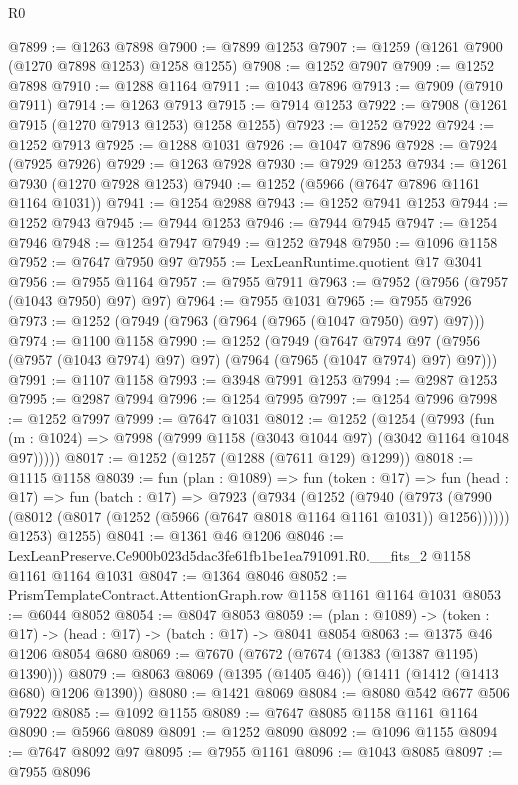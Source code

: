 \begin{lexlean}{R0}
\begin{coremodule}
@7899 := @1263 @7898
@7900 := @7899 @1253
@7907 := @1259 (@1261 @7900 (@1270 @7898 @1253) @1258 @1255)
@7908 := @1252 @7907
@7909 := @1252 @7898
@7910 := @1288 @1164
@7911 := @1043 @7896
@7913 := @7909 (@7910 @7911)
@7914 := @1263 @7913
@7915 := @7914 @1253
@7922 := @7908 (@1261 @7915 (@1270 @7913 @1253) @1258 @1255)
@7923 := @1252 @7922
@7924 := @1252 @7913
@7925 := @1288 @1031
@7926 := @1047 @7896
@7928 := @7924 (@7925 @7926)
@7929 := @1263 @7928
@7930 := @7929 @1253
@7934 := @1261 @7930 (@1270 @7928 @1253)
@7940 := @1252 (@5966 (@7647 @7896 @1161 @1164 @1031))
@7941 := @1254 @2988
@7943 := @1252 @7941 @1253
@7944 := @1252 @7943
@7945 := @7944 @1253
@7946 := @7944 @7945
@7947 := @1254 @7946
@7948 := @1254 @7947
@7949 := @1252 @7948
@7950 := @1096 @1158
@7952 := @7647 @7950 @97
@7955 := LexLeanRuntime.quotient @17 @3041
@7956 := @7955 @1164
@7957 := @7955 @7911
@7963 := @7952 (@7956 (@7957 (@1043 @7950) @97) @97)
@7964 := @7955 @1031
@7965 := @7955 @7926
@7973 := @1252 (@7949 (@7963 (@7964 (@7965 (@1047 @7950) @97) @97)))
@7974 := @1100 @1158
@7990 := @1252
    (@7949
      (@7647 @7974 @97 (@7956 (@7957 (@1043 @7974) @97) @97) (@7964 (@7965 (@1047 @7974) @97) @97)))
@7991 := @1107 @1158
@7993 := @3948 @7991 @1253
@7994 := @2987 @1253
@7995 := @2987 @7994
@7996 := @1254 @7995
@7997 := @1254 @7996
@7998 := @1252 @7997
@7999 := @7647 @1031
@8012 := @1252
    (@1254
      (@7993 (fun (m : @1024) => @7998 (@7999 @1158 (@3043 @1044 @97) (@3042 @1164 @1048 @97)))))
@8017 := @1252 (@1257 (@1288 (@7611 @129) @1299))
@8018 := @1115 @1158
@8039 := fun (plan : @1089) =>
  fun (token : @17) =>
  fun (head : @17) =>
  fun (batch : @17) =>
  @7923
    (@7934
      (@1252
        (@7940
          (@7973 (@7990 (@8012 (@8017 (@1252 (@5966 (@7647 @8018 @1164 @1161 @1031)) @1256))))))
        @1253)
      @1255)
@8041 := @1361 @46 @1206
@8046 := LexLeanPreserve.Ce900b023d5dac3fe61fb1be1ea791091.R0.__fits_2 @1158 @1161 @1164 @1031
@8047 := @1364 @8046
@8052 := PrismTemplateContract.AttentionGraph.row @1158 @1161 @1164 @1031
@8053 := @6044 @8052
@8054 := @8047 @8053
@8059 := (plan : @1089) -> (token : @17) -> (head : @17) -> (batch : @17) -> @8041 @8054
@8063 := @1375 @46 @1206 @8054 @680
@8069 := @7670 (@7672 (@7674 (@1383 (@1387 @1195) @1390)))
@8079 := @8063 @8069 (@1395 (@1405 @46)) (@1411 (@1412 (@1413 @680) @1206 @1390))
@8080 := @1421 @8069
@8084 := @8080 @542 @677 @506 @7922
@8085 := @1092 @1155
@8089 := @7647 @8085 @1158 @1161 @1164
@8090 := @5966 @8089
@8091 := @1252 @8090
@8092 := @1096 @1155
@8094 := @7647 @8092 @97
@8095 := @7955 @1161
@8096 := @1043 @8085
@8097 := @7955 @8096

\end{coremodule}
\end{lexlean}
